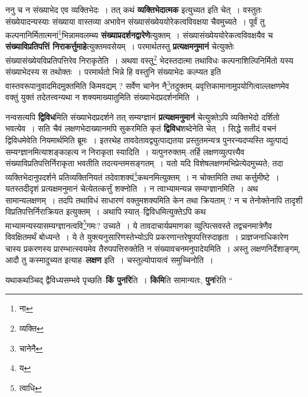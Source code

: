 \documentclass[article,12pt,a4paper]{memoir}
\begin{document}
	  \pstart ननु च न संख्याभेद एव व्यक्तिभेदः । तत् कथं \textbf{व्यक्तिभेदात्मक} इत्युच्यत इति चेत् । वस्तुतः संख्येयादन्यस्याः संख्याया वास्तव्या अभावेन संख्यासंख्येययोरेकत्वविवक्षया चैवमुच्यते । पूर्वं तु कल्पनानिर्मितात्मनां\footnote{ना}\-भिन्नामवलम्ब्य \textbf{संख्याप्रदर्शनद्वारेणे}त्युक्तम् । संख्यासंख्येययोरेकत्वविवक्षयैव च \textbf{संख्याविप्रतिपत्तिं निराकर्त्तुमाहे}त्युक्तमवसेयम् । परमार्थतस्तु \textbf{प्रत्यक्षमनुमानं} चेत्युक्तेः संख्यासंख्येयविप्रतिपत्तिरेव निराकृतेति । अथवा वस्तु\footnote{व्यक्ति} भेदस्तदात्मा तथाविधः कल्पनाशिल्पिनिर्मितो यस्य संख्याभेदस्य स तथोक्तः । परमार्थतो भिन्ने हि वस्तुनि संख्याभेदः कल्प्यत इति वास्तवरूपानुवादमिदमुक्तमिति किमवद्यम् ? सर्वेण चानेन नै\footnote{चानेनै}तदुक्तम्--प्रवृत्तिकामानामुपयोगित्वाल्लक्षणमेव वक्तुं युक्तं तदेतत्त्वन्यथा न शक्यमाख्यातुमिति संख्याभेदप्रदर्शनमिति ।
	\pend
      

	  \pstart नन्वसत्यपि \textbf{द्विविध}मिति संख्याभेदप्रदर्शने तत् सम्यग्ज्ञानं \textbf{प्रत्यक्षमनुमानं} चेत्युक्तेऽपि व्यक्तिभेदो दर्शितो भवत्येव । सति चैवं लक्षणभेदाख्यानमपि सुकरमिति कृतं \textbf{द्विविध}शब्देनेति चेत् । सिद्धे सतीदं वचनं द्विविधमेवेति नियमार्थमिति ब्रूमः । इतरथेह तावदेतावद्व्युत्पाद्यतया प्रस्तुतमन्यत्र पुनरन्यदप्यस्ति व्युत्पाद्यं सम्यग्ज्ञानमित्याशङ्काहत्य न निराकृता स्यादिति । यत्पुनरुक्तम्--तर्हि लक्षणव्युत्पत्त्यैव संख्याविप्रतिपत्तिर्निराकृता भवतीति तदत्यन्तमसङ्गतम् । यतो यदि विशेषलक्षणमभिप्रेत्येदमुच्यते; तदा व्यक्तिभेदानुपदर्शने प्रतिव्यक्तिनियतं तदेवाशक्यं\footnote{य}\-कथनमित्युक्तम् । न चोक्तमिति तथा कर्त्तुमीष्टे । यतस्तदीदृशं प्रत्यक्षमनुमानं चेत्येतत्कर्त्तुं शक्नोति । न त्वाभ्यामन्यन्न सम्यग्ज्ञानमिति । अथ सामान्यलक्षणम् । तदपि तथाविधं साधारणं वक्तुमशक्यमिति केन तथा क्रियताम् ? न च तेनोक्तेनापि तादृशी विप्रतिपत्तिर्निराक्रियत इत्युक्तम् । अथापि स्यात्--द्विविधमित्युक्तेऽपि कथ \leavevmode{} माभ्यामन्यस्यासम्यग्ज्ञानत्ववि\footnote{त्वाधि}\-गमः? उच्यते । ये तावदाचार्यप्रमाणका व्युत्पित्सवस्ते तद्वचनमात्रेणैव विवक्षितमर्थं बोध्यन्ते । ये ते युक्त्यनुसारिणस्तेभ्योऽपि प्रकरणान्तरेषूपपत्तिरुदाहृता । प्राज्ञजनाधिकारेण चास्य प्रकरणस्य प्रारम्भात्स्वयमेव तैरुपपत्तिरुक्तेति न संख्यावचनमनुपादेयमिति । अस्तु लक्षणनिर्देशाङ्गम्, आदौ तु कस्मादुच्यत इत्याह--\textbf{लक्षण} इति । चस्तुल्योपायत्वं समुच्चिनोति ।
	\pend
      

	  \pstart यथाकथञ्चिद् द्वैविध्यसम्भवे पृच्छति--\textbf{किं पुनरि}ति । \textbf{किमि}ति सामान्यतः, \textbf{पुन}रिति \leavevmode{} “
	  
\end{document}
